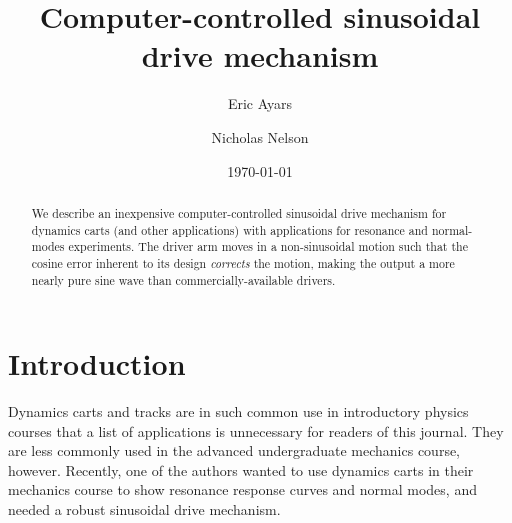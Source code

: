 \documentclass[prb,preprint]{revtex4-1}
\begin{document}
\title{Computer-controlled sinusoidal drive mechanism}

\author{Eric Ayars}
\author{Nicholas Nelson}

\date{\today}

\begin{abstract}
We describe an inexpensive computer-controlled sinusoidal drive mechanism for dynamics carts (and other applications) with applications for resonance and normal-modes experiments.
The driver arm moves in a non-sinusoidal motion such that the cosine error inherent to its design \emph{corrects} the motion, making the output a more nearly pure sine wave than commercially-available drivers.
\end{abstract}

\maketitle

\section{Introduction}

Dynamics carts and tracks are in such common use in introductory physics courses that a list of applications is unnecessary for readers of this journal.
They are less commonly used in the advanced undergraduate mechanics course, however.
Recently, one of the authors wanted to use dynamics carts in their mechanics course to show resonance response curves and normal modes, and needed a robust sinusoidal drive mechanism.
\end{document}
